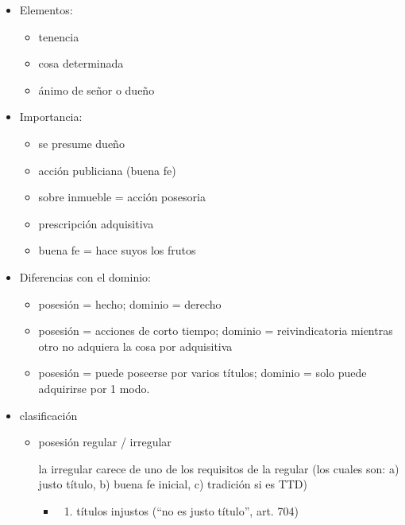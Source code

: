 \documentclass[]{article}
\providecommand{\tightlist}{%
  \setlength{\itemsep}{0pt}\setlength{\parskip}{0pt}}
\begin{document}
\begin{itemize}
\begin{itemize}
\begin{itemize}
      \begin{itemize}
      \tightlist
      \item
        Elementos:

        \begin{itemize}
        \tightlist
        \item
          tenencia
        \item
          cosa determinada
        \item
          ánimo de señor o dueño
        \end{itemize}
      \item
        Importancia:

        \begin{itemize}
        \tightlist
        \item
          se presume dueño
        \item
          acción publiciana (buena fe)
        \item
          sobre inmueble = acción posesoria
        \item
          prescripción adquisitiva
        \item
          buena fe = hace suyos los frutos
        \end{itemize}
      \item
        Diferencias con el dominio:

        \begin{itemize}
        \tightlist
        \item
          posesión = hecho; dominio = derecho
        \item
          posesión = acciones de corto tiempo; dominio = reivindicatoria
          mientras otro no adquiera la cosa por adquisitiva
        \item
          posesión = puede poseerse por varios títulos; dominio = solo
          puede adquirirse por 1 modo.
        \end{itemize}
      \item
        clasificación

        \begin{itemize}
        \item
          posesión regular / irregular

          la irregular carece de uno de los requisitos de la regular
          (los cuales son: a) justo título, b) buena fe inicial, c)
          tradición si es TTD)

          \begin{itemize}
          \item
            \begin{enumerate}
            \def\labelenumi{\alph{enumi})}
            \tightlist
            \item
              títulos injustos (``no es justo título'', art. 704)
            \end{enumerate}


\end{itemize}
\end{itemize}
\end{itemize}
\end{itemize}
\end{itemize}
\end{itemize}
\end{document}
